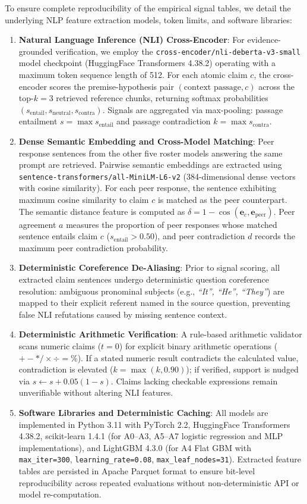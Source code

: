 \documentclass[pdflatex,sn-mathphys,Numbered]{sn-jnl}
\begin{document}
To ensure complete reproducibility of the empirical signal tables, we detail the underlying NLP feature extraction models, token limits, and software libraries:
\begin{enumerate}
    \item \textbf{Natural Language Inference (NLI) Cross-Encoder}: For evidence-grounded verification, we employ the \texttt{cross-encoder/nli-deberta-v3-small} model checkpoint (HuggingFace Transformers 4.38.2) operating with a maximum token sequence length of 512. For each atomic claim $c$, the cross-encoder scores the premise-hypothesis pair $(\text{context passage}, c)$ across the top-$k=3$ retrieved reference chunks, returning softmax probabilities $(s_{\mathrm{entail}}, s_{\mathrm{neutral}}, s_{\mathrm{contra}})$. Signals are aggregated via max-pooling: passage entailment $s = \max s_{\mathrm{entail}}$ and passage contradiction $k = \max s_{\mathrm{contra}}$.
    \item \textbf{Dense Semantic Embedding and Cross-Model Matching}: Peer response sentences from the other five roster models answering the same prompt are retrieved. Pairwise semantic embeddings are extracted using \texttt{sentence-transformers/all-MiniLM-L6-v2} (384-dimensional dense vectors with cosine similarity). For each peer response, the sentence exhibiting maximum cosine similarity to claim $c$ is matched as the peer counterpart. The semantic distance feature is computed as $\delta = 1 - \cos(\mathbf{e}_c, \mathbf{e}_{\mathrm{peer}})$. Peer agreement $a$ measures the proportion of peer responses whose matched sentence entails claim $c$ ($s_{\mathrm{entail}} > 0.50$), and peer contradiction $d$ records the maximum peer contradiction probability.
    \item \textbf{Deterministic Coreference De-Aliasing}: Prior to signal scoring, all extracted claim sentences undergo deterministic question coreference resolution: ambiguous pronominal subjects (e.g., \emph{``It'', ``He'', ``They''}) are mapped to their explicit referent named in the source question, preventing false NLI refutations caused by missing sentence context.
    \item \textbf{Deterministic Arithmetic Verification}: A rule-based arithmetic validator scans numeric claims ($t=0$) for explicit binary arithmetic operations ($+ - * / \times \div = \%$). If a stated numeric result contradicts the calculated value, contradiction is elevated ($k = \max(k, 0.90)$); if verified, support is nudged via $s \leftarrow s + 0.05(1-s)$. Claims lacking checkable expressions remain unverifiable without altering NLI features.
    \item \textbf{Software Libraries and Deterministic Caching}: All models are implemented in Python 3.11 with PyTorch 2.2, HuggingFace Transformers 4.38.2, scikit-learn 1.4.1 (for A0--A3, A5--A7 logistic regression and MLP implementations), and LightGBM 4.3.0 (for A4 Flat GBM with \texttt{max\_iter=300}, \texttt{learning\_rate=0.08}, \texttt{max\_leaf\_nodes=31}). Extracted feature tables are persisted in Apache Parquet format to ensure bit-level reproducibility across repeated evaluations without non-deterministic API or model re-computation.
\end{enumerate}
\end{document}

